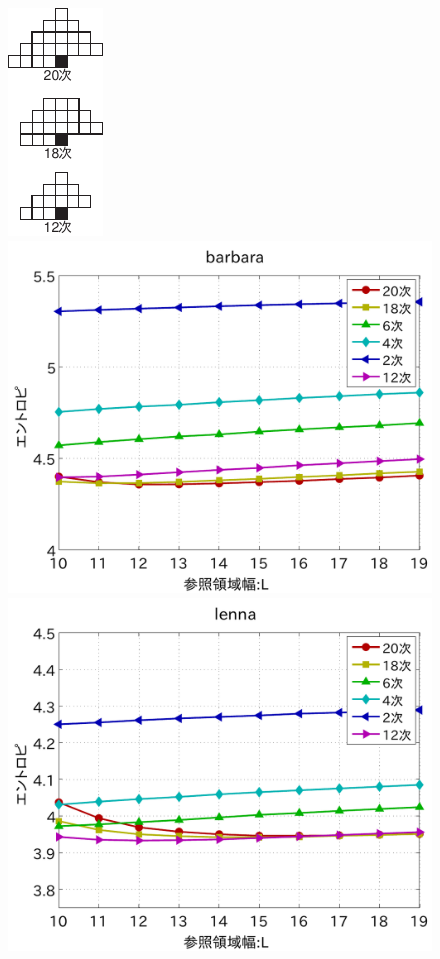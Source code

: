 \documentclass[25pt,landscape,dvipdfmx,uplatex]{foils}
\begin{document}
\begin{figure}[b]
\begin{center}
\vspace{-1cm}
\includegraphics[scale=2]{fig/yosokusiki.pdf}
\includegraphics[width=11.5cm]{fig/test1/barbara.pdf}
\includegraphics[width=11.5cm]{fig/test1/lenna.pdf}\\

\end{center}
\end{figure}
\end{document}
